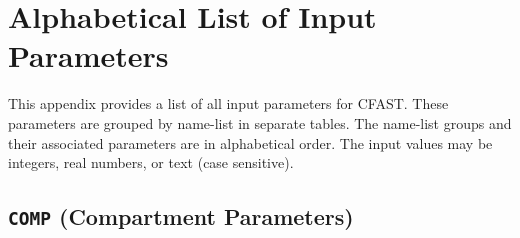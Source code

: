 \chapter{Alphabetical List of Input Parameters} \label{sec:CFAST_Keywords}



This appendix provides a list of all input parameters for CFAST. These parameters are grouped by name-list in separate tables. The name-list groups and their associated parameters are in alphabetical order. The input values may be integers, real numbers, or text (case sensitive).


\section{\texorpdfstring{{\tt COMP}}{COMP} (Compartment Parameters)}

